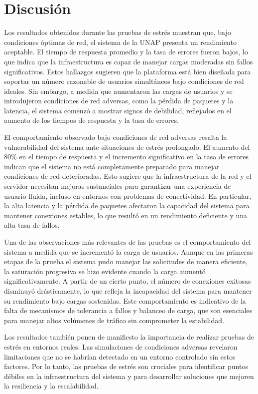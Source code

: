 \documentclass{article}
\begin{document}
\section{Discusión}

Los resultados obtenidos durante las pruebas de estrés muestran que, bajo condiciones óptimas de red, el sistema de la UNAP presenta un rendimiento aceptable. El tiempo de respuesta promedio y la tasa de errores fueron bajos, lo que indica que la infraestructura es capaz de manejar cargas moderadas sin fallos significativos. Estos hallazgos sugieren que la plataforma está bien diseñada para soportar un número razonable de usuarios simultáneos bajo condiciones de red ideales. Sin embargo, a medida que aumentaron las cargas de usuarios y se introdujeron condiciones de red adversas, como la pérdida de paquetes y la latencia, el sistema comenzó a mostrar signos de debilidad, reflejados en el aumento de los tiempos de respuesta y la tasa de errores.

El comportamiento observado bajo condiciones de red adversas resalta la vulnerabilidad del sistema ante situaciones de estrés prolongado. El aumento del 80\% en el tiempo de respuesta y el incremento significativo en la tasa de errores indican que el sistema no está completamente preparado para manejar condiciones de red deterioradas. Esto sugiere que la infraestructura de la red y el servidor necesitan mejoras sustanciales para garantizar una experiencia de usuario fluida, incluso en entornos con problemas de conectividad. En particular, la alta latencia y la pérdida de paquetes afectaron la capacidad del sistema para mantener conexiones estables, lo que resultó en un rendimiento deficiente y una alta tasa de fallos.

Una de las observaciones más relevantes de las pruebas es el comportamiento del sistema a medida que se incrementó la carga de usuarios. Aunque en las primeras etapas de la prueba el sistema pudo manejar las solicitudes de manera eficiente, la saturación progresiva se hizo evidente cuando la carga aumentó significativamente. A partir de un cierto punto, el número de conexiones exitosas disminuyó drásticamente, lo que refleja la incapacidad del sistema para mantener su rendimiento bajo cargas sostenidas. Este comportamiento es indicativo de la falta de mecanismos de tolerancia a fallos y balanceo de carga, que son esenciales para manejar altos volúmenes de tráfico sin comprometer la estabilidad.

Los resultados también ponen de manifiesto la importancia de realizar pruebas de estrés en entornos reales. Las simulaciones de condiciones adversas revelaron limitaciones que no se habrían detectado en un entorno controlado sin estos factores. Por lo tanto, las pruebas de estrés son cruciales para identificar puntos débiles en la infraestructura del sistema y para desarrollar soluciones que mejoren la resiliencia y la escalabilidad.
\end{document}
